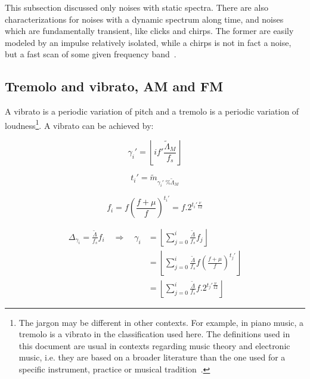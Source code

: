 This subsection discussed only noises with static spectra.
There are also characterizations for noises with a dynamic spectrum along time,
and noises which are fundamentally transient, like clicks and chirps. The former are easily modeled by an impulse relatively isolated, while a chirps is not in fact a noise, but a fast scan of some given frequency band~\cite{Cook}.

\subsection{Tremolo and vibrato, AM and FM}\label{subsec:tvaf}
A vibrato is a periodic variation of pitch and a tremolo is a periodic variation of loudness\footnote{The
jargon may be different in other contexts. For example, in piano music, a tremolo is a vibrato in the classification used here.
The definitions used in this document are usual in contexts regarding music theory and electronic music,
i.e. they are based on a broader literature than the one used for a specific instrument,
practice or musical tradition~\cite{Lacerda,Harmonia}.}.
A vibrato can be achieved by:

\begin{equation}\label{vbrGamma}
 \gamma_i'=\left \lfloor i f' \frac{\widetilde{\Lambda}_M}{f_s} \right \rfloor
\end{equation}

\begin{equation}\label{vbrAux}
 t_i'=\widetilde{m}_{\gamma_i' \;\% \widetilde{\Lambda}_M}
\end{equation}

\begin{equation}\label{vbrF}
 f_i=f \left ( \frac{f + \mu }{f} \right )^{t_i'}=f . 2^{t_i'\frac{\nu}{12}}
\end{equation}

\begin{equation}\label{vbrGamma2}
\begin{split}
	\Delta_{\gamma_i}=\frac{\widetilde{\Lambda}}{f_s}f_i \quad \Rightarrow \quad \gamma_i & = \left \lfloor \sum_{j=0}^{i} \frac{\widetilde{\Lambda}}{f_s}f_j \right \rfloor \\ 
	& = \left \lfloor \sum_{j=0}^{i} \frac{\widetilde{\Lambda}}{f_s}f \left ( \frac{f + \mu }{f} \right )^{t_j'}  \right \rfloor \\
	& = \left \lfloor \sum_{j=0}^{i} \frac{\widetilde{\Lambda}}{f_s}f . 2^{t_j'\frac{\nu}{12}}  \right \rfloor
\end{split}
\end{equation}


